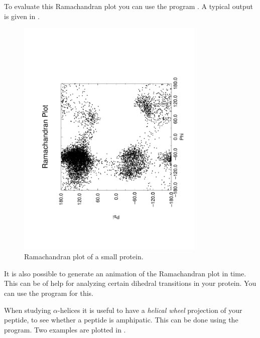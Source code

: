 {To evaluate this Ramachandran plot you can use the program {\tt {}}. 
A typical output is given in .

\begin{figure}
\centerline{
{\includegraphics[width=9cm,angle=270]{plots/rama}}}
\caption{Ramachandran plot of a small protein.}
\label{fig:rama}
\end{figure}

It is also possible to generate an animation of the Ramachandran plot
in time. This can be of help for analyzing certain dihedral transitions 
in your protein. You can use the program {\tt {}} for this.

When studying $\alpha$-helices 
it is useful to have a {\em helical wheel} projection
of your peptide, to see whether a peptide is amphipatic. This can be done
using the {\tt {}} program. Two examples are 
plotted in .

}
